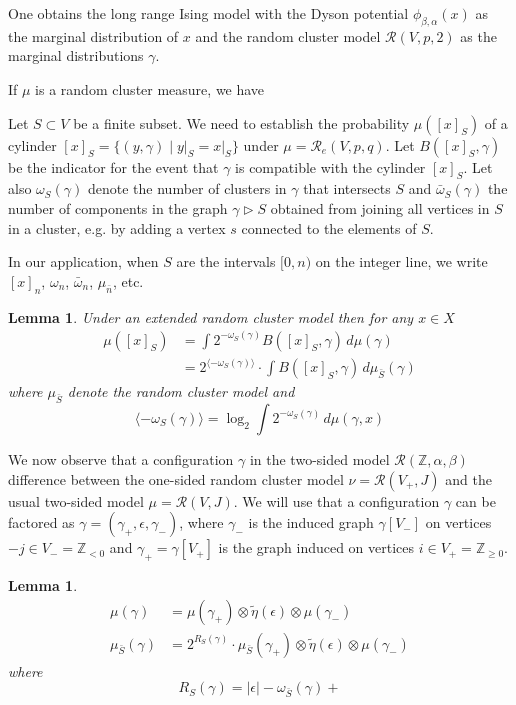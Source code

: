 \documentclass[11pt, a4paper]{amsart}
\newtheorem{lem}[thm]{Lemma}
\theoremstyle{definition}
\theoremstyle{remark}
\renewcommand{\d}{\,d}
\providecommand{\ZZ}{\mathbb{Z}}
\providecommand{\mscr}{\mathscr}
\providecommand{\e}{\epsilon}
\providecommand{\g}{\gamma}
\providecommand{\w}{\omega}
\def\X{X}
\begin{document}
One obtains the long range Ising model with the Dyson potential $\phi_{\beta,\alpha}(x)$ as
the marginal distribution of $x$ and the random cluster model $\mscr R(V,p,2)$
as the marginal distributions $\g$.

If $\mu$ is a random cluster measure, we have 

\def\cc#1{{\langle #1 \rangle}}

Let $S\subset V$ be a finite subset.
We need to establish the probability $\mu([x]_S)$ of a cylinder 
$[x]_S=\{(y,\g) \mid y\vert_S = x\vert_S\}$ under $\mu=\mscr R_e(V,p,q)$.
Let $B([x]_S,\g)$ be the indicator for the event that $\g$ is compatible with 
the cylinder $[x]_S$. Let also $\w_S(\g)$ denote the number of clusters in $\gamma$ that intersects $S$ and $\bar\w_S(\g)$ the number of components in the graph $\g\triangleright S$
obtained from joining all 
vertices in $S$ in a cluster, e.g. by adding a vertex $s$ connected to the elements of $S$.

In our application, when $S$ are the intervals $[0,n)$ on the integer line,
we write $[x]_n$, $\w_n$, $\bar\w_n$, $\mu_{\bar n}$, etc. 

\begin{lem}\label{probcyl}
Under an extended random cluster model then for any $x\in\X$
\begin{align}
    \mu([x]_S) &=  \int 2^{-\w_S(\g)} B([x]_S,\g) \d\mu(\g) \\
    &= 2^\cc{-\w_S(\g)} \cdot \int B([x]_S,\g) \d \mu_{\bar S}(\g)  
\end{align}
where $\mu_{\bar S}$ denote the random cluster model and 
$$ \cc{-\w_S(\g)} = \log_2 \int 2^{-\w_S(\g)} \d\mu(\g,x) $$
\end{lem}


We now observe that a configuration $\g$ in the two-sided model
$\mscr R(\ZZ,\alpha,\beta)$ difference between the one-sided random cluster model
$\nu = \mscr R(V_+,J)$ and the usual two-sided model $\mu = \mscr R(V,J)$. We will
use that a configuration $\g$ can be factored as $\g = (\g_+, \e, \g_-)$, where
$\g_-$ is the induced graph $\g[V_-]$ on vertices $-j\in V_-=\ZZ_{<0}$ and
$\g_+=\g[V_+]$ is the graph induced on vertices $i\in V_+=\ZZ_{\ge0}$. 

\begin{lem}
\begin{align}
\mu(\g) &= \mu(\g_+) \otimes \tilde\eta(\e) \otimes \mu(\g_-) \\
\mu_{\bar S}(\g) &= 2^{R_S(\g)} \cdot \mu_{\bar S}(\g_+) \otimes \tilde\eta(\e) \otimes \mu(\g_-) 
\end{align}
where 
$$
R_S(\g) = |\e|-\w_{\bar S}(\g)+ 
$$
\end{lem}
\end{document}
